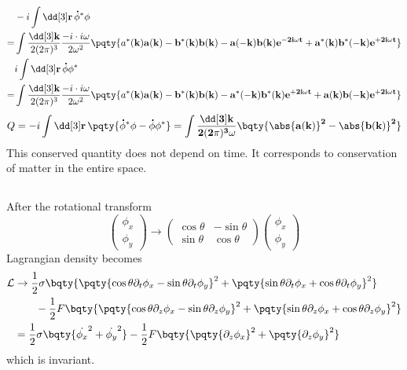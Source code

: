 \documentclass[12pt]{article}
\begin{document}
            \subsubsection{} { \begin{align*}
                &- i\int \dd[3] \bf r\, {\dot{\phi}^*\phi}\\
                =& \int \frac{\dd[3]\bf k}{2 (2\pi)^3} \frac{ - i \cdot i\omega }{2\omega^2} \pqty{a^*(\bf k)a(\bf k) - b^*(\bf k)b(\bf k) - a( -\bf k)b(\bf k)e^{ - 2i\omega t } +a^*(\bf k)b^*( -\bf k)e^{ + 2i\omega t}}\\
                &i\int \dd[3] \bf r\, {\dot{\phi}\phi^*}\\
                =& \int \frac{\dd[3]\bf k}{2 (2\pi)^3} \frac{ - i \cdot i\omega }{2\omega^2} \pqty{a^*(\bf k)a(\bf k) - b^*(\bf k)b(\bf k) - a^*( -\bf k){b^*}(\bf k)e^{ + 2i\omega t } + a(\bf k)b( -\bf k)e^{ + 2i\omega t}}
            \end{align*}}
            \[
                Q =  - i\int \dd[3] \bf r\, \pqty{\dot{\phi}^*\phi - \dot{\phi} \phi^*} =\int \frac{ \dd[3] \bf k}{2(2\pi)^3 \omega } \bqty{\abs{a(\bf k)}^2 -\abs{b(\bf k)}^2}
            \]
            This conserved quantity does not depend on time. It corresponds to conservation of matter in the entire space.
            \subsection{} After the rotational transform
            \[
                \begin{pmatrix} \phi_x\\ \phi_y \end{pmatrix} \to \begin{pmatrix} \cos\theta &- \sin\theta \\ \sin\theta &\cos\theta  \end{pmatrix} \begin{pmatrix} \phi_x \\ \phi_y \end{pmatrix}  
            \] 
            Lagrangian density becomes \begin{align*}
                \mathcal{L} & \to \frac{1}{2}\sigma  \bqty{\pqty{\cos \theta \partial_t \phi_x - \sin\theta \partial_t\phi_y}^2 +\pqty{\sin \theta \partial_t \phi_x + \cos\theta \partial_t\phi_y}^2} \\
                &\qquad - \frac{1}{2}F\bqty{\pqty{\cos \theta \partial_z \phi_x - \sin\theta \partial_z\phi_y}^2 +\pqty{\sin \theta \partial_z \phi_x + \cos\theta \partial_z\phi_y}^2}\\
                &=  \frac{1}{2} \sigma \bqty{\dot{\phi_x}^2 + \dot{\phi_y}^2} - \frac{1}{2}F \bqty{\pqty{\partial_z \phi_x}^2 + \pqty{\partial_z \phi_y}^2}
            \end{align*}
            which is invariant.
\end{document}
